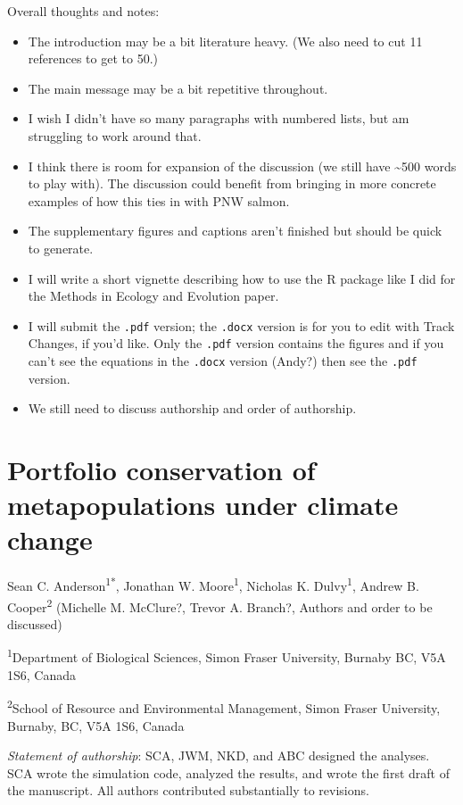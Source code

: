 Overall thoughts and notes:

\begin{itemize}
\item
  The introduction may be a bit literature heavy. (We also need to cut 11 references to get to 50.)
\item
  The main message may be a bit repetitive throughout.
\item
  I wish I didn't have so many paragraphs with numbered lists, but am struggling to work around that.
\item
  I think there is room for expansion of the discussion (we still have \textasciitilde{}500 words to play with). The discussion could benefit from bringing in more concrete examples of how this ties in with PNW salmon.
\item
  The supplementary figures and captions aren't finished but should be quick to generate.
\item
  I will write a short vignette describing how to use the R package like I did for the Methods in Ecology and Evolution paper.
\item
  I will submit the \texttt{.pdf} version; the \texttt{.docx} version is for you to edit with Track Changes, if you'd like. Only the \texttt{.pdf} version contains the figures and if you can't see the equations in the \texttt{.docx} version (Andy?) then see the \texttt{.pdf} version.
\item
  We still need to discuss authorship and order of authorship.
\end{itemize}

\newpage

\section{Portfolio conservation of metapopulations under climate change}

\bigskip

Sean C. Anderson\textsuperscript{1*}, Jonathan W. Moore\textsuperscript{1}, Nicholas K. Dulvy\textsuperscript{1}, Andrew B. Cooper\textsuperscript{2} (Michelle M. McClure?, Trevor A. Branch?, Authors and order to be discussed)

\textsuperscript{1}Department of Biological Sciences, Simon Fraser University, Burnaby BC, V5A 1S6, Canada

\textsuperscript{2}School of Resource and Environmental Management, Simon Fraser University, Burnaby, BC, V5A 1S6, Canada

\emph{Statement of authorship}: SCA, JWM, NKD, and ABC designed the analyses. SCA wrote the simulation code, analyzed the results, and wrote the first draft of the manuscript. All authors contributed substantially to revisions.

